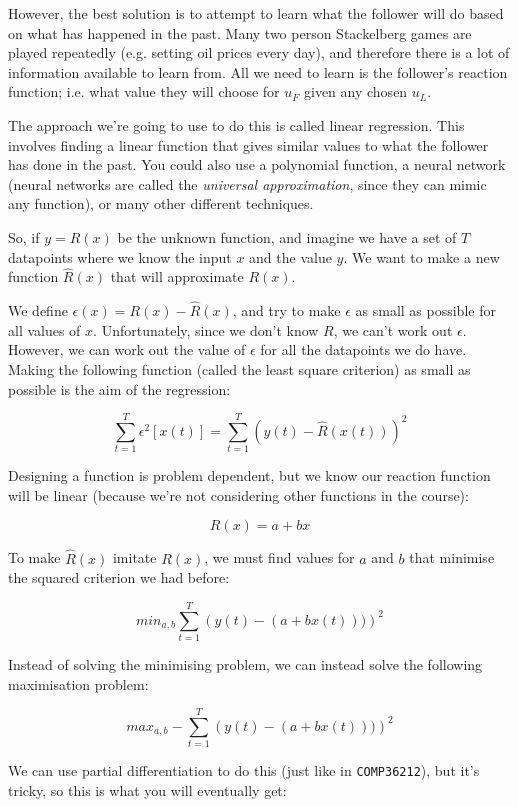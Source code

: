 However, the best solution is to attempt to learn what the follower will do
based on what has happened in the past. Many two person Stackelberg games are
played repeatedly (e.g. setting oil prices every day), and therefore there is a
lot of information available to learn from. All we need to learn is the
follower's reaction function; i.e. what value they will choose for $u_F$ given
any chosen $u_L$.

The approach we're going to use to do this is called linear regression. This
involves finding a linear function that gives similar values to what the
follower has done in the past. You could also use a polynomial function, a
neural network (neural networks are called the \textit{universal approximation},
since they can mimic any function), or many other different techniques.

So, if $y = R(x)$ be the unknown function, and imagine we have a set of $T$
datapoints where we know the input $x$ and the value $y$. We want to make a new
function $\hat{R}(x)$ that will approximate $R(x)$.

We define $\epsilon(x) = R(x) - \hat{R}(x)$, and try to make
$\epsilon$ as small as possible for all values of $x$. Unfortunately,
since we don't know $R$, we can't work out $\epsilon$. However, we can
work out the value of $\epsilon$ for all the datapoints we do
have. Making the following function (called the least square
criterion) as small as possible is the aim of the regression:

\[
  \sum^T_{t=1}\epsilon^2[x(t)] = \sum^T_{t=1}\left(y(t) - \hat{R}(x(t))\right)^2
\]

Designing a function is problem dependent, but we know our reaction
function will be linear (because we're not considering other functions
in the course):

\[
  R(x) = a + bx
\]

To make $\hat{R}(x)$ imitate $R(x)$, we must find values for $a$ and $b$ that
minimise the squared criterion we had before:

\[
  min_{a,b} \sum^T_{t=1}\left(y(t) - (a + b x(t)))\right)^2
\]

Instead of solving the minimising problem, we can instead solve the following
maximisation problem:

\[
  max_{a,b} - \sum^T_{t=1}\left(y(t) - (a + b x(t)))\right)^2
\]

We can use partial differentiation to do this (just like in
\texttt{COMP36212}), but it's tricky, so this is what you will eventually get:

